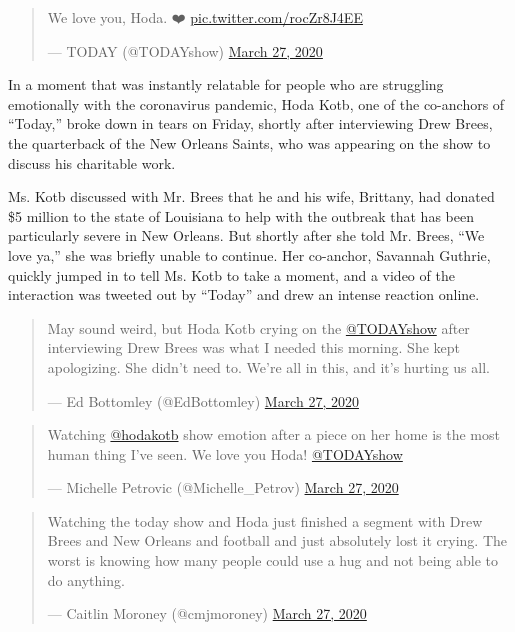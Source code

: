 \begin{quote}
We love you, Hoda. ❤️
\href{https://t.co/rocZr8J4EE}{pic.twitter.com/rocZr8J4EE}

--- TODAY (@TODAYshow)
\href{https://twitter.com/TODAYshow/status/1243505483568353281?ref_src=twsrc\%5Etfw}{March
27, 2020}
\end{quote}

In a moment that was instantly relatable for people who are struggling
emotionally with the coronavirus pandemic, Hoda Kotb, one of the
co-anchors of ``Today,'' broke down in tears on Friday, shortly after
interviewing Drew Brees, the quarterback of the New Orleans Saints, who
was appearing on the show to discuss his charitable work.

Ms. Kotb discussed with Mr. Brees that he and his wife, Brittany, had
donated \$5 million to the state of Louisiana to help with the outbreak
that has been particularly severe in New Orleans. But shortly after she
told Mr. Brees, ``We love ya,'' she was briefly unable to continue. Her
co-anchor, Savannah Guthrie, quickly jumped in to tell Ms. Kotb to take
a moment, and a video of the interaction was tweeted out by ``Today''
and drew an intense reaction online.

\begin{quote}
May sound weird, but Hoda Kotb crying on the
\href{https://twitter.com/TODAYshow?ref_src=twsrc\%5Etfw}{@TODAYshow}
after interviewing Drew Brees was what I needed this morning. She kept
apologizing. She didn't need to. We're all in this, and it's hurting us
all.

--- Ed Bottomley (@EdBottomley)
\href{https://twitter.com/EdBottomley/status/1243504613065703425?ref_src=twsrc\%5Etfw}{March
27, 2020}
\end{quote}

\begin{quote}
Watching
\href{https://twitter.com/hodakotb?ref_src=twsrc\%5Etfw}{@hodakotb} show
emotion after a piece on her home is the most human thing I've seen. We
love you Hoda!
\href{https://twitter.com/TODAYshow?ref_src=twsrc\%5Etfw}{@TODAYshow}

--- Michelle Petrovic (@Michelle\_Petrov)
\href{https://twitter.com/Michelle_Petrov/status/1243503622987616256?ref_src=twsrc\%5Etfw}{March
27, 2020}
\end{quote}

\begin{quote}
Watching the today show and Hoda just finished a segment with Drew Brees
and New Orleans and football and just absolutely lost it crying. The
worst is knowing how many people could use a hug and not being able to
do anything.

--- Caitlin Moroney (@cmjmoroney)
\href{https://twitter.com/cmjmoroney/status/1243503568809799686?ref_src=twsrc\%5Etfw}{March
27, 2020}
\end{quote}

